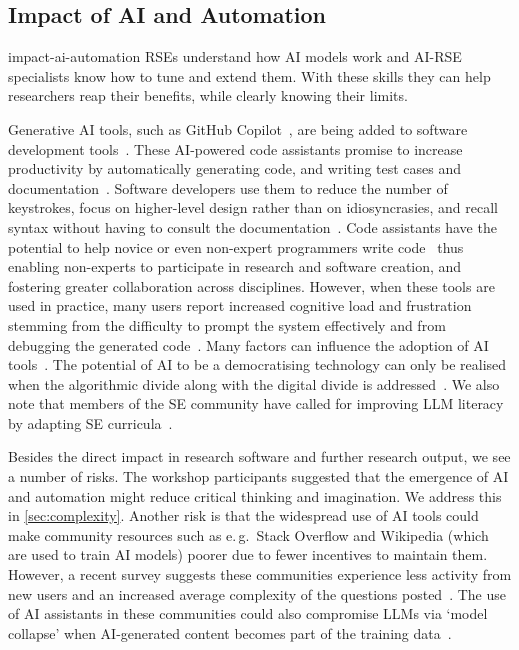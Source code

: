 \documentclass{eceasst}
\newcommand{\eg}{e.\,g.}
\begin{document}
\subsection{Impact of AI and Automation}
\label{sec:ai}
\begin{whatis}{}{impact-ai-automation}
RSEs understand how AI models work and AI-RSE specialists know how to tune and extend them.
With these skills they can help researchers reap their benefits,
while clearly knowing their limits.
\end{whatis}
Generative AI tools, such as GitHub Copilot~\cite{Friedmann2021},
are being added to software development tools~\cite{Alenezi2025}.
These AI-powered code assistants promise to increase productivity
by automatically generating code, and writing test cases and documentation~\cite{Banh2025}.
Software developers use them to reduce the number of keystrokes,
focus on higher-level design rather than on idiosyncrasies,
and recall syntax without having to consult the documentation~\cite{Liang2024}.
Code assistants have the potential to help novice or even non-expert programmers
write code~\cite{Feldman2024} thus enabling non-experts to participate in research
and software creation, and fostering greater collaboration across disciplines.
However, when these tools are used in practice, many users report increased cognitive
load and frustration stemming from the difficulty to prompt the system effectively
and from debugging the generated code~\cite{Simkute2025}.
Many factors can influence the adoption of AI tools~\cite{Russo2024}.
The potential of AI to be a democratising technology can only be realised
when the algorithmic divide along with the digital divide is addressed~\cite{Yu2020}.
We also note that members of the SE community have called for improving LLM literacy
by adapting SE curricula~\cite{Kirova2024}.

Besides the direct impact in research software and further research output,
we see a number of risks.
The workshop participants suggested that the emergence of AI and automation might reduce critical thinking and imagination.
We address this in \autoref{sec:complexity}.
Another risk is that the widespread use of AI tools could make community resources
such as \eg\ Stack Overflow and Wikipedia (which are used to train AI models) poorer
due to fewer incentives to maintain them.
However, a recent survey suggests these communities experience less activity from new
users and an increased average complexity of the questions posted~\cite{Burtch2024}.
The use of AI assistants in these communities could also compromise LLMs via `model collapse'
when AI-generated content becomes part of the training data~\cite{Shumailov2024}.
\end{document}
